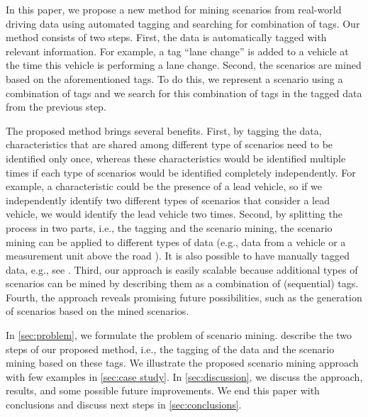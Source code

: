 In this paper, we propose a new method for mining scenarios from real-world driving data using automated tagging and searching for combination of tags. 
Our method consists of two steps. 
First, the data is automatically tagged with relevant information. For example, a tag ``lane change'' is added to a vehicle at the time this vehicle is performing a lane change. 
Second, the scenarios are mined based on the aforementioned tags. \cenda
\cstartd To do this, we represent a scenario using a combination of tags and we search for this combination of tags in the tagged data from the previous step. \cendd

\cstarta The proposed method brings several benefits. 
First, by tagging the data, characteristics that are shared among different type of scenarios need to be identified only once, whereas these characteristics would be identified multiple times if each type of scenarios would be identified completely independently. \cenda
\cstartf For example, a characteristic could be the presence of a lead vehicle, so if we independently identify two different types of scenarios that consider a lead vehicle, we would identify the lead vehicle two times. \cendf
\cstarta Second, by splitting the process in two parts, i.e., the tagging and the scenario mining, the scenario mining can be applied to different types of data (e.g., data from a vehicle \autocite{paardekooper2019dataset6000km} or a measurement unit above the road \autocite{kovvali2007video,krajewski2018highD}). 
It is also possible to have manually tagged data, e.g., see \autocite{fontana2018action}. 
Third, our approach is easily scalable because additional types of scenarios can be mined by  describing them as a combination of (sequential) tags. \cenda
\cstartf Fourth, the approach reveals promising future possibilities, such as the generation of scenarios based on the mined scenarios. \cendf

\cstarta In \cref{sec:problem}, we formulate the problem of scenario mining.  describe the two steps of our proposed method, i.e., the tagging of the data and the scenario mining based on these tags. 
We illustrate the proposed scenario mining approach with few examples in \cref{sec:case study}. \cenda
\cstartf In \cref{sec:discussion}, we discuss the approach, results, and some possible future improvements. \cendf
We end this paper with conclusions and discuss next steps in \cref{sec:conclusions}. \cenda
